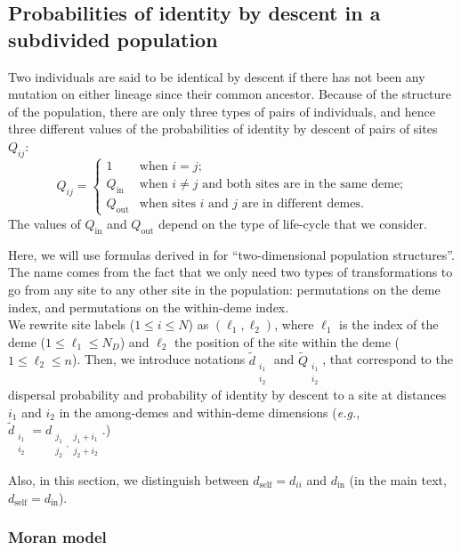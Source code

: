 \documentclass[11pt, letterpaper]{article}
\newcommand{\eg}{\textit{e.g.}}
\newcommand{\self}{\textrm{self}}
\newcommand{\inn}{\textrm{in}}
\newcommand{\out}{\textrm{out}}
\newcommand{\din}{d_{\inn}}
\newcommand{\dself}{d_{\self}}
\newcommand{\Qin}{Q_{\inn}}
\newcommand{\Qout}{Q_{\out}}
\newcommand{\ndemes}{N_D}
\begin{document}
\clearpage
\subsection{\label{sec:app:Qsubdiv}Probabilities of identity by descent in a subdivided population}
Two individuals are said to be identical by descent if there has not been any mutation on either lineage since their common ancestor. Because of the structure of the population, there are only three types of pairs of individuals, and hence three different values of the probabilities of identity by descent of pairs of sites $Q_{ij}$:
\begin{equation}
Q_{ij} = 
\begin{cases}
1 & \textrm{when $i=j$;}\\
%
\Qin & \textrm{when $i\neq j$ and both sites are in the same deme;}\\
%
\Qout & \textrm{when sites $i$ and $j$ are in different demes.}
\end{cases}
\end{equation}
The values of $\Qin$ and $\Qout$ depend on the type of life-cycle that we consider. 

Here, we will use formulas derived in \citet{Debarre2017} for ``two-dimensional population structures''. The name comes from the fact that we only need two types of transformations to go from any site to any other site in the population: permutations on the deme index, and permutations on the within-deme index.  \\
%
We rewrite site labels ($1\leq i \leq N$) as $(\ell_1, \ell_2)$, where $\ell_1$ is the index of the deme ($1\leq \ell_1 \leq \ndemes$) and $\ell_2$ the position of the site within the deme ($1\leq \ell_2 \leq n$). Then, we introduce notations $\tilde{d}_{\substack{i_1\\i_2}}$ and $\tilde{Q}_{\substack{i_1\\i_2}}$, that correspond to the dispersal probability and probability of identity by descent to a site at distances $i_1$ and $i_2$ in the among-demes and within-deme dimensions (\eg, $\tilde{d}_{\substack{i_1\\i_2}} = d_{\substack{j_1\\j_2}, \substack{j_1+i_1\\j_2+i_2}}$.) 

Also, in this section, we distinguish between $\dself = d_{ii}$ and $\din$ (in the main text, $\dself = \din$). 

\subsubsection{Moran model}
\end{document}
